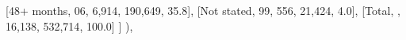 \documentclass[
  11pt,
  a4paper,
]{article}
\newenvironment{Shaded}{\begin{snugshade}}{\end{snugshade}}
\newcommand{\NormalTok}[1]{\textcolor[rgb]{0.00,0.23,0.31}{#1}}
\newcommand{\StringTok}[1]{\textcolor[rgb]{0.13,0.47,0.30}{#1}}
\begin{document}
\begin{Shaded}
\begin{Highlighting}[]
\NormalTok{            [}\StringTok{\textquotesingle{}48+ months\textquotesingle{}}\NormalTok{, }\StringTok{\textquotesingle{}06\textquotesingle{}}\NormalTok{, }\StringTok{\textquotesingle{}6,914\textquotesingle{}}\NormalTok{, }\StringTok{\textquotesingle{}190,649\textquotesingle{}}\NormalTok{, }\StringTok{\textquotesingle{}35.8\textquotesingle{}}\NormalTok{],}
\NormalTok{            [}\StringTok{\textquotesingle{}Not stated\textquotesingle{}}\NormalTok{, }\StringTok{\textquotesingle{}99\textquotesingle{}}\NormalTok{, }\StringTok{\textquotesingle{}556\textquotesingle{}}\NormalTok{, }\StringTok{\textquotesingle{}21,424\textquotesingle{}}\NormalTok{, }\StringTok{\textquotesingle{}4.0\textquotesingle{}}\NormalTok{],}
\NormalTok{            [}\StringTok{\textquotesingle{}Total\textquotesingle{}}\NormalTok{, }\StringTok{\textquotesingle{}\textquotesingle{}}\NormalTok{, }\StringTok{\textquotesingle{}16,138\textquotesingle{}}\NormalTok{, }\StringTok{\textquotesingle{}532,714\textquotesingle{}}\NormalTok{, }\StringTok{\textquotesingle{}100.0\textquotesingle{}}\NormalTok{]}
\NormalTok{        ]}
\NormalTok{    ),}


\end{Highlighting}
\end{Shaded}
\end{document}

